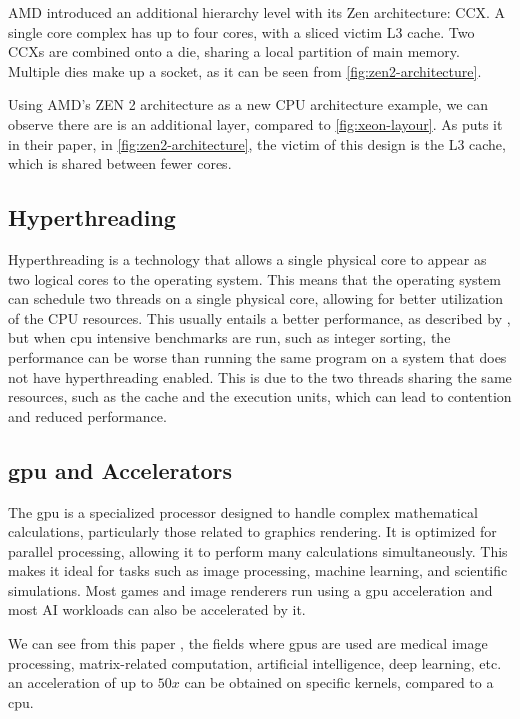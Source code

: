 AMD introduced an additional hierarchy level with its Zen architecture: \gls{CCX}. A single core complex has up to four cores, with a sliced victim L3 cache. Two \glspl{CCX} are combined onto a die, sharing a local partition of main memory. Multiple dies make up a socket, as it can be seen from \autoref{fig:zen2-architecture}.	

Using AMD's ZEN 2 architecture as a new CPU architecture example, we can observe there are is an additional layer, compared to \autoref{fig:xeon-layour}. As \textcite{zen2-architecture} puts it in their paper, in \autoref{fig:zen2-architecture}, the victim of this design is the L3 cache, which is shared between fewer cores.


\subsection{Hyperthreading}
\label{sec:hyperthreading}
Hyperthreading is a technology that allows a single physical core to appear as two logical cores to the operating system. This means that the operating system can schedule two threads on a single physical core, allowing for better utilization of the CPU resources. This usually entails a better performance, as described by \textcite{hyperthreading}, but when \gls{cpu} intensive benchmarks are run, such as integer sorting, the performance can be worse than running the same program on a system that does not have hyperthreading enabled. This is due to the two threads sharing the same resources, such as the cache and the execution units, which can lead to contention and reduced performance.


\subsection{\gls{gpu} and Accelerators}
\label{sec:gpu-accelerators}
The \gls{gpu} is a specialized processor designed to handle complex mathematical calculations, particularly those related to graphics rendering. It is optimized for parallel processing, allowing it to perform many calculations simultaneously. This makes it ideal for tasks such as image processing, machine learning, and scientific simulations. Most games and image renderers run using a \gls{gpu} acceleration and most AI workloads can also be accelerated by it.

We can see from this paper \cite{gpu-energy-efficiency}, the fields where \glspl{gpu} are used are medical image processing, matrix-related computation, artificial intelligence, deep learning, etc. an acceleration of up to $50x$ can be obtained on specific kernels, compared to a \gls{cpu}.

